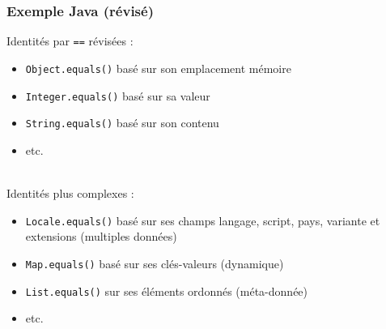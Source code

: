 \documentclass[draft]{beamer}
\DeclareRobustCommand{\todo}[1]{\ifdraft{\textbf{\textcolor{red}{[#1]}}}{}}
\begin{document}
\begin{frame}
\frametitle{Exemple Java (révisé)}
Identités par \lstinline{==} révisées :
\begin{itemize}
 \item \lstinline{Object.equals()} basé sur son emplacement mémoire
 \item \lstinline{Integer.equals()} basé sur sa valeur
 \item \lstinline{String.equals()} basé sur son contenu
 \item etc.
\end{itemize}
~\\
Identités plus complexes :
\begin{itemize}
 \item \lstinline{Locale.equals()} basé sur ses champs langage, script, pays, variante et extensions (multiples données)
 \item \lstinline{Map.equals()} basé sur ses clés-valeurs (dynamique)
 \item \lstinline{List.equals()} sur ses éléments ordonnés (méta-donnée)
 \item etc.
\end{itemize}
\end{frame}

\end{document}
